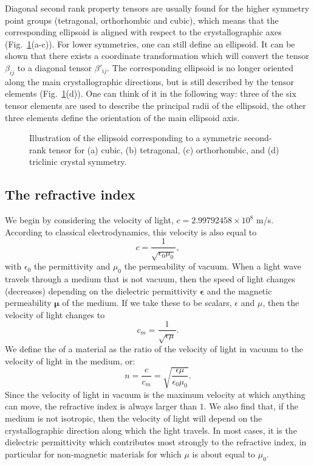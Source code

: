 Diagonal second rank property tensors are usually found for the higher symmetry point groups (tetragonal, orthorhombic and cubic), which means that the corresponding ellipsoid is aligned with respect to the crystallographic axes (Fig.~\ref{\chabbr:fig:tensorellipsoid}(a-c)).  For lower symmetries, one can still define an ellipsoid.  It can be shown that there exists a coordinate transformation which will convert the tensor $\beta_{ij}$ to a diagonal tensor $\beta'_{ij}$.  The corresponding ellipsoid is no longer oriented along the main crystallographic directions, but is still described by the tensor elements (Fig.~\ref{\chabbr:fig:tensorellipsoid}(d)).  One can think of it in the following way: three of the six tensor elements are used to describe the principal radii of the ellipsoid, the other three elements define the orientation of the main ellipsoid axis.  

\begin{figure}[h]
\centering\leavevmode
\caption{Illustration of the ellipsoid corresponding to a symmetric second-rank tensor for (a) cubic, (b) tetragonal, (c) orthorhombic, and (d) triclinic crystal symmetry.}
\label{\chabbr:fig:tensorellipsoid}
\end{figure}

\subsection{The refractive index}

We begin by considering the velocity of light, $c=2.99792458\times 10^{8}$ m/s.  According to classical electrodynamics, this velocity is also equal to
\begin{equation}
	c = \frac{1}{\sqrt{\epsilon_0\mu_0}},
\end{equation}
with $\epsilon_0$ the permittivity and $\mu_0$ the permeability of vacuum.  When a light wave travels through a medium that is not vacuum, then the speed of light changes (decreases) depending on the dielectric permittivity $\bm{\epsilon}$ and the magnetic permeability $\bm{\mu}$ of the medium.  If we take these to be scalars, $\epsilon$ and $\mu$, then the velocity of light changes to 
\begin{equation}
	c_m = \frac{1}{\sqrt{\epsilon\mu}}.
\end{equation}
We define the  of a material as the ratio of the velocity of light in vacuum to the velocity of light in the medium, or:
\begin{equation}
	n = \frac{c}{c_m} = \sqrt{\frac{\epsilon\mu}{\epsilon_0\mu_0}}.
\end{equation}
Since the velocity of light in vacuum is the maximum velocity at which anything can move, the refractive index is always larger than $1$.  We also find that, if the medium is not isotropic, then the velocity of light will depend on the crystallographic direction along which the light travels.  In most cases, it is the dielectric permittivity which contributes most strongly to the refractive index, in particular for non-magnetic materials for which $\mu$ is about equal to $\mu_0$.

